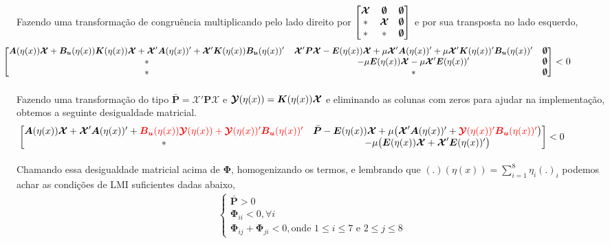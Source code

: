 \documentclass[a4paper,10pt]{article}
\begin{document}
\paragraph{}Fazendo uma transformação de congruência multiplicando pelo lado direito por $\begin{bmatrix}
	\bm{\mathcal{X}} & \bm{\emptyset} & \bm{\emptyset} \\
	* & \bm{\mathcal{X}} & \bm{\emptyset} \\
	* & * & \bm{\emptyset}
\end{bmatrix}$ e por sua transposta no lado esquerdo,
\begin{gather}
	\hspace{-1.85cm}\small{\begin{bmatrix}
		\Af\bm{\mathcal{X}} + \Buf\Kf\bm{\mathcal{X}} + \bm{\mathcal{X}}'\Af' + \bm{\mathcal{X}}'\Kf\Buf' & \bm{\mathcal{X}}'\bm{P}\bm{\mathcal{X}} - \Ef\bm{\mathcal{X}} + \mu\bm{\mathcal{X}}'\Af' + \mu\bm{\mathcal{X}}'\Kf'\Buf' & \zero \\
		* & -\mu\Ef\bm{\mathcal{X}}-\mu\bm{\mathcal{X}}'\Ef' & \zero \\
		* & * & \zero
	\end{bmatrix} < 0}
\end{gather}
\paragraph{}Fazendo uma transformação do tipo $\bar{\bm{P}} = \bm{\mathcal{X}}'\bm{P}\bm{\mathcal{X}}$ e $\bm{\mathcal{Y}}(\eta(x)) = \bm{K}(\eta(x))\bm{\mathcal{X}}$ e eliminando as colunas com zeros para ajudar na implementação, obtemos a seguinte desigualdade matricial.
\begin{gather}
\hspace{-1.5cm}	\begin{bmatrix}
		\Af\bm{\mathcal{X}} + \bm{\mathcal{X}}'\Af' + \color{red}{\Buf\bm{\mathcal{Y}}(\eta(x))} + \bm{\mathcal{Y}}(\eta(x))'\Buf' & \bar{\bm{P}} - \Ef\bm{\mathcal{X}} + \mu\big(\bm{\mathcal{X}}'\Af' + \color{red}{\bm{\mathcal{Y}}(\eta(x))'\Buf'}\color{black}\big) \\
		* & -\mu\big(\Ef\bm{\mathcal{X}}+\bm{\mathcal{X}}'\Ef'\big)
	\end{bmatrix} < 0
\end{gather}
\paragraph{}Chamando essa desigualdade matricial acima de $\bm{\Phi}$, homogenizando os termos, e lembrando que $(.)(\eta(x)) = \sum_{i=1}^{8}\eta_{i}(.)_i$ podemos achar as condições de LMI suficientes dadas abaixo,
\begin{gather}
	\begin{cases}
		\bar{\bm{P}} > 0 \\
		\bm{\Phi}_{ii} < 0, \forall{i} \\
		\bm{\Phi}_{ij} + \bm{\Phi}_{ji} < 0, \text{onde $1 \leq i  \leq 7$ e $2 \leq j  \leq 8$} 
	\end{cases}
\end{gather}
\end{document}
